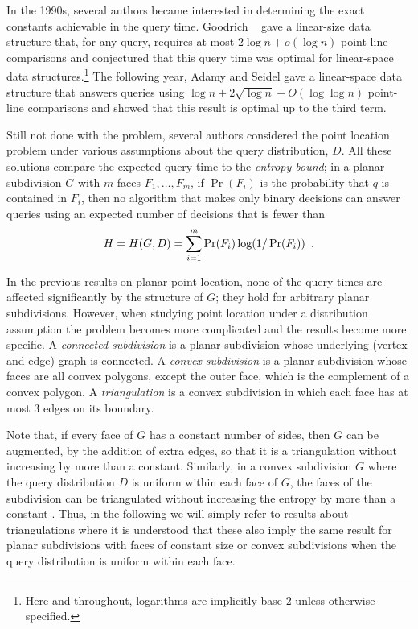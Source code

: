 \documentclass[lotsofwhite]{patmorin}
\begin{document}
In the 1990s, several authors became interested in determining the
exact constants achievable in the query time.  Goodrich \etal\
\cite{gor97} gave a linear-size data structure that, for any query,
requires at most $2\log n + o(\log n)$ point-line comparisons and
conjectured that this query time was optimal for linear-space data
structures.\footnote{Here and throughout, logarithms are implicitly base 2
unless otherwise specified.} The following year, Adamy and Seidel
\cite{as98} gave a linear-space data structure that answers queries
using $\log n + 2\sqrt{\log n} + O(\log\log n)$ point-line comparisons
and showed that this result is optimal up to the third term.

Still not done with the problem, several authors considered the
point location problem under various assumptions about the query
distribution, $D$.  All these solutions compare the expected query time
to the \emph{entropy bound};  in a planar subdivision $G$ with $m$ faces
$F_1,\ldots,F_m$, if $\Pr(F_i)$ is the probability that $q$ is contained
in $F_i$, then no algorithm that makes only binary decisions can answer
queries using an expected number of decisions that is fewer than
\begin{equation}
    H = H(G,D) = \sum_{i=1}^m \Pr(F_i)\log(1/\Pr(F_i)) \enspace . 
	\eqlabelx{entropy-face}
\end{equation}

In the previous results on planar point location, none of the query
times are affected significantly by the structure of $G$;  they hold
for arbitrary planar subdivisions.  However, when studying point
location under a distribution assumption the problem becomes more
complicated and the results become more specific.  A \emph{connected
subdivision} is a planar subdivision whose underlying (vertex and
edge) graph is connected.  A \emph{convex subdivision} is a planar
subdivision whose faces are all convex polygons, except the outer
face, which is the complement of a convex polygon.  A
\emph{triangulation} is a convex subdivision in which each face has at
most 3 edges on its boundary.

Note that, if every face of $G$ has a constant number of sides, then
$G$ can be augmented, by the addition of extra edges, so that it is a
triangulation without increasing \eqrefx{entropy-face} by more than a
constant.  Similarly, in a convex subdivision $G$ where the query
distribution $D$ is uniform within each face of $G$, the faces of the
subdivision can be triangulated without increasing the entropy by more
than a constant \cite{amm00}. Thus, in the following we will simply
refer to results about triangulations where it is understood that
these also imply the same result for planar subdivisions with faces of
constant size or convex subdivisions when the query distribution is
uniform within each face.
\end{document}
